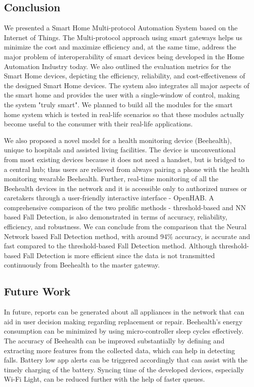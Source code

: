 \subsection{Conclusion}
We presented a Smart Home Multi-protocol Automation System based on the Internet of Things. The Multi-protocol approach using smart gateways helps us minimize the cost and maximize efficiency and, at the same time, address the major problem of interoperability of smart devices being developed in the Home Automation Industry today. We also outlined the evaluation metrics for the Smart Home devices, depicting the efficiency, reliability, and cost-effectiveness of the designed Smart Home devices. The system also integrates all major aspects of the smart home and provides the user with a single-window of control, making the system "truly smart". We planned to build all the modules for the smart home system which is tested in real-life scenarios so that these modules actually become useful to the consumer with their real-life applications.

We also proposed a novel model for a health monitoring device (Beehealth), unique to hospitals and assisted living facilities. The device is unconventional from most existing devices because it does not need a handset, but is bridged to a central hub; thus users are relieved from always pairing a phone with the health monitoring wearable Beehealth. Further, real-time monitoring of all the Beehealth devices in the network and it is accessible only to authorized nurses or caretakers through a user-friendly interactive interface - OpenHAB. A comprehensive comparison of the two prolific methods - threshold-based and NN based Fall Detection, is also demonstrated in terms of accuracy, reliability, efficiency, and robustness. We can conclude from the comparison that the Neural Network based Fall Detection method, with around 94\% accuracy, is accurate and fast compared to the threshold-based Fall Detection method. Although threshold-based Fall Detection is more efficient since the data is not transmitted continuously from Beehealth to the master gateway.    

\subsection{Future Work}
In future, reports can be generated about all appliances in the network that can aid in user decision making regarding replacement or repair. Beehealth's energy consumption can be minimized by using micro-controller sleep cycles effectively. The accuracy of Beehealth can be improved substantially by defining and extracting more features from the collected data, which can help in detecting falls. Battery low app alerts can be triggered accordingly that can assist with the timely charging of the battery. Syncing time of the developed devices, especially Wi-Fi Light, can be reduced further with the help of faster queues.


